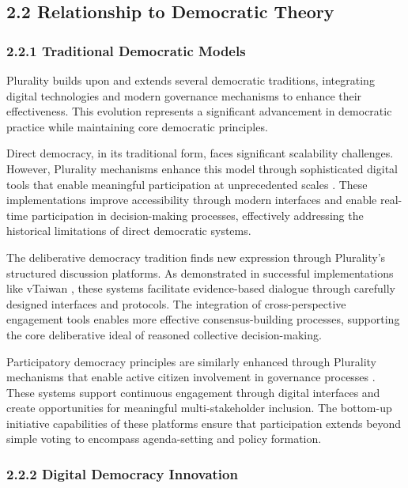 \hypertarget{relationship-to-democratic-theory}{%
\subsection{2.2 Relationship to Democratic Theory}\label{relationship-to-democratic-theory}}

\hypertarget{traditional-democratic-models}{%
\subsubsection{2.2.1 Traditional Democratic Models}\label{traditional-democratic-models}}

Plurality builds upon and extends several democratic traditions, integrating digital technologies and modern governance mechanisms to enhance their effectiveness. This evolution represents a significant advancement in democratic practice while maintaining core democratic principles.

Direct democracy, in its traditional form, faces significant scalability challenges. However, Plurality mechanisms enhance this model through sophisticated digital tools that enable meaningful participation at unprecedented scales \citep{vtaiwan2023}. These implementations improve accessibility through modern interfaces and enable real-time participation in decision-making processes, effectively addressing the historical limitations of direct democratic systems.

The deliberative democracy tradition finds new expression through Plurality's structured discussion platforms. As demonstrated in successful implementations like vTaiwan \citep{vtaiwan2023}, these systems facilitate evidence-based dialogue through carefully designed interfaces and protocols. The integration of cross-perspective engagement tools enables more effective consensus-building processes, supporting the core deliberative ideal of reasoned collective decision-making.

Participatory democracy principles are similarly enhanced through Plurality mechanisms that enable active citizen involvement in governance processes \citep{polis2024}. These systems support continuous engagement through digital interfaces and create opportunities for meaningful multi-stakeholder inclusion. The bottom-up initiative capabilities of these platforms ensure that participation extends beyond simple voting to encompass agenda-setting and policy formation.

\hypertarget{digital-democracy-innovation}{%
\subsubsection{2.2.2 Digital Democracy Innovation}\label{digital-democracy-innovation}}

